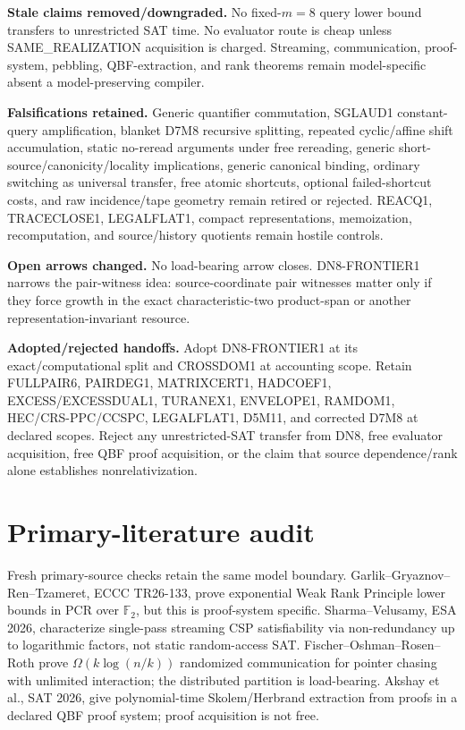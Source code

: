 \documentclass[11pt]{article}
\begin{document}
\textbf{Stale claims removed/downgraded.} No fixed-\(m=8\) query lower bound transfers to unrestricted SAT time. No evaluator route is cheap unless SAME\_REALIZATION acquisition is charged. Streaming, communication, proof-system, pebbling, QBF-extraction, and rank theorems remain model-specific absent a model-preserving compiler.

\textbf{Falsifications retained.} Generic quantifier commutation, SGLAUD1 constant-query amplification, blanket D7M8 recursive splitting, repeated cyclic/affine shift accumulation, static no-reread arguments under free rereading, generic short-source/canonicity/locality implications, generic canonical binding, ordinary switching as universal transfer, free atomic shortcuts, optional failed-shortcut costs, and raw incidence/tape geometry remain retired or rejected. REACQ1, TRACECLOSE1, LEGALFLAT1, compact representations, memoization, recomputation, and source/history quotients remain hostile controls.

\textbf{Open arrows changed.} No load-bearing arrow closes. DN8-FRONTIER1 narrows the pair-witness idea: source-coordinate pair witnesses matter only if they force growth in the exact characteristic-two product-span or another representation-invariant resource.

\textbf{Adopted/rejected handoffs.} Adopt DN8-FRONTIER1 at its exact/computational split and CROSSDOM1 at accounting scope. Retain FULLPAIR6, PAIRDEG1, MATRIXCERT1, HADCOEF1, EXCESS/EXCESSDUAL1, TURANEX1, ENVELOPE1, RAMDOM1, HEC/CRS-PPC/CCSPC, LEGALFLAT1, D5M11, and corrected D7M8 at declared scopes. Reject any unrestricted-SAT transfer from DN8, free evaluator acquisition, free QBF proof acquisition, or the claim that source dependence/rank alone establishes nonrelativization.

\section*{Primary-literature audit}
Fresh primary-source checks retain the same model boundary. Garlik--Gryaznov--Ren--Tzameret, ECCC TR26-133, prove exponential Weak Rank Principle lower bounds in PCR over \(\mathbb F_2\), but this is proof-system specific. Sharma--Velusamy, ESA 2026, characterize single-pass streaming CSP satisfiability via non-redundancy up to logarithmic factors, not static random-access SAT. Fischer--Oshman--Rosen--Roth prove \(\Omega(k\log(n/k))\) randomized communication for pointer chasing with unlimited interaction; the distributed partition is load-bearing. Akshay et al., SAT 2026, give polynomial-time Skolem/Herbrand extraction from proofs in a declared QBF proof system; proof acquisition is not free.
\end{document}
